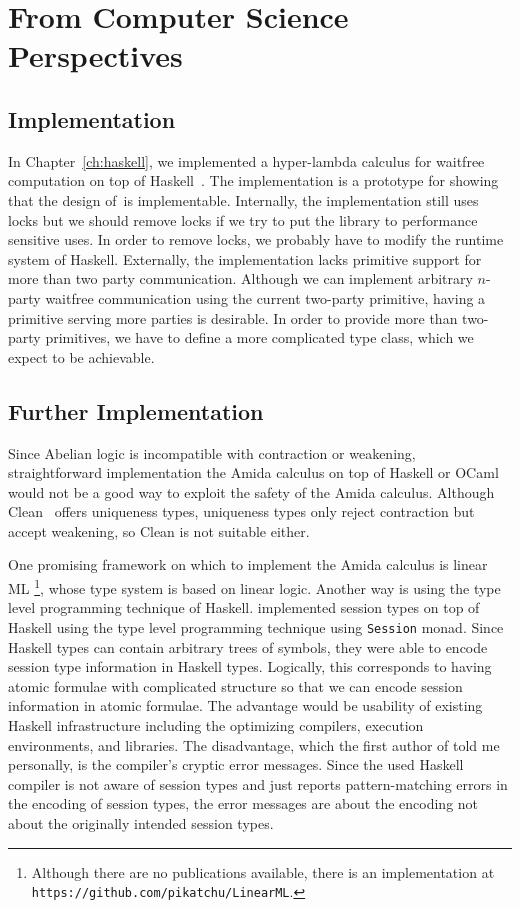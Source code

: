 \section{From Computer Science Perspectives}

\subsection{Implementation}

In Chapter~\ref{ch:haskell}, we implemented a hyper-lambda calculus for
waitfree computation on top of Haskell~\citep{marlow2010haskell}.
The implementation is a prototype for showing that the design of \lgd\,is
implementable.
Internally, the implementation still uses locks but we should remove
locks if we try to put the library to performance sensitive uses.
In order to remove locks, we probably have to modify the runtime system
of Haskell.
Externally, the implementation lacks primitive support for more than two
party communication.  Although we can implement arbitrary $n$-party
waitfree communication using the current two-party primitive, having
a primitive serving more parties is desirable.
In order to provide more than two-party primitives,
we have to define a more complicated type class, which we expect to be
achievable.

\subsection{Further Implementation}

Since Abelian logic is incompatible with contraction or weakening,
straightforward implementation the Amida calculus on top of Haskell or OCaml
would not be a
good way to exploit the safety of the Amida calculus.
Although Clean~\citep{parle1991} offers uniqueness types,
uniqueness types only reject contraction but accept weakening, so Clean
is not suitable either.

One promising framework on which to implement the Amida calculus is linear ML%
\footnote{Although there are no
publications available, there is an implementation at
\texttt{https://github.com/pikatchu/LinearML}\enspace.},
whose type system is based on linear logic.
Another way is using the type level programming technique of Haskell.
\citet{DBLP:journals/corr/abs-1110-4163} implemented session types on top
of Haskell using the type level programming technique using
\texttt{Session} monad.  Since Haskell types can contain arbitrary trees
of symbols, they were able to encode session type information in Haskell
types.
Logically, this corresponds to having atomic formulae with complicated
structure so that we can encode session information in atomic formulae.
The advantage would be usability of existing Haskell infrastructure
including the optimizing compilers, execution environments, and
libraries.
The disadvantage, which the first author of
\citep{DBLP:journals/corr/abs-1110-4163} told me personally,
is the compiler's cryptic error messages.
Since the used Haskell compiler is not aware of session types and just reports
pattern-matching errors in the encoding of session types, the error
messages are about the encoding not about the originally intended
session types.

